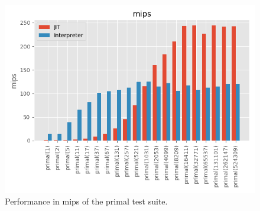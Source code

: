 \begin{figure}
    \centering
    \includegraphics{output/graphs/tests/primal/mips.png}
    \caption{Performance in mips of the primal test suite.}
    \label{figure:primal-mips}
\end{figure}